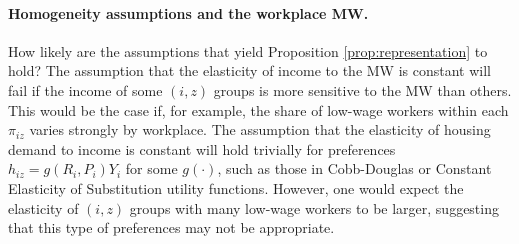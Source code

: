 \paragraph{Homogeneity assumptions and the workplace MW.}

How likely are the assumptions that yield Proposition \ref{prop:representation}
to hold?
The assumption that the elasticity of income to the MW is constant will fail if 
the income of some $(i,z)$ groups is more sensitive to the MW than others.
This would be the case if, for example, the share of low-wage workers within 
each $\pi_{iz}$ varies strongly by workplace.
The assumption that the elasticity of housing demand to income is constant 
will hold trivially for preferences
$h_{iz} = g\left(R_i, P_i\right) Y_i$ for some $g\left(\cdot\right)$, such as 
those in Cobb-Douglas or Constant Elasticity of Substitution utility functions.
However, one would expect the elasticity of $(i,z)$ groups with many low-wage 
workers to be larger, suggesting that this type of preferences may not be 
appropriate.

